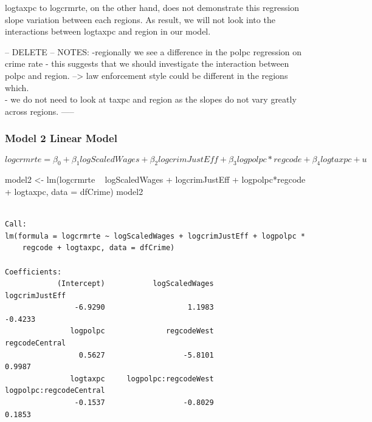 \documentclass[]{article}
\newenvironment{Shaded}{}{}
\newcommand{\DataTypeTok}[1]{#1}
\newcommand{\KeywordTok}[1]{\textcolor[rgb]{0.00,0.00,1.00}{#1}}
\newcommand{\NormalTok}[1]{#1}
\newcommand{\OperatorTok}[1]{#1}
\newcommand{\StringTok}[1]{\textcolor[rgb]{0.00,0.50,0.50}{#1}}
\begin{document}
logtaxpc to logcrmrte, on the other hand, does not demonstrate this
regression slope variation between each regions. As result, we will not
look into the interactions between logtaxpc and region in our model.

-- DELETE -- NOTES: -regionally we see a difference in the polpc
regression on crime rate - this suggests that we should investigate the
interaction between polpc and region. --\textgreater{} law enforcement
style could be different in the regions which.\\
- we do not need to look at taxpc and region as the slopes do not vary
greatly across regions. -----

\hypertarget{model-2-linear-model}{%
\subsubsection{Model 2 Linear Model}\label{model-2-linear-model}}

\[logcrmrte = \beta_0 + \beta_1logScaledWages + \beta_2logcrimJustEff + \beta_3logpolpc * regcode + \beta_4logtaxpc + u\]

\begin{Shaded}
\begin{Highlighting}[]
\NormalTok{model2 <-}\StringTok{ }\KeywordTok{lm}\NormalTok{(logcrmrte }\OperatorTok{~}\StringTok{ }\NormalTok{logScaledWages }\OperatorTok{+}\StringTok{ }\NormalTok{logcrimJustEff }\OperatorTok{+}\StringTok{ }\NormalTok{logpolpc}\OperatorTok{*}\NormalTok{regcode }\OperatorTok{+}\StringTok{ }\NormalTok{logtaxpc, }\DataTypeTok{data =}\NormalTok{ dfCrime)}
\NormalTok{model2}
\end{Highlighting}
\end{Shaded}

\begin{verbatim}

Call:
lm(formula = logcrmrte ~ logScaledWages + logcrimJustEff + logpolpc * 
    regcode + logtaxpc, data = dfCrime)

Coefficients:
            (Intercept)           logScaledWages           logcrimJustEff  
                -6.9290                   1.1983                  -0.4233  
               logpolpc              regcodeWest           regcodeCentral  
                 0.5627                  -5.8101                   0.9987  
               logtaxpc     logpolpc:regcodeWest  logpolpc:regcodeCentral  
                -0.1537                  -0.8029                   0.1853  
\end{verbatim}
\end{document}
